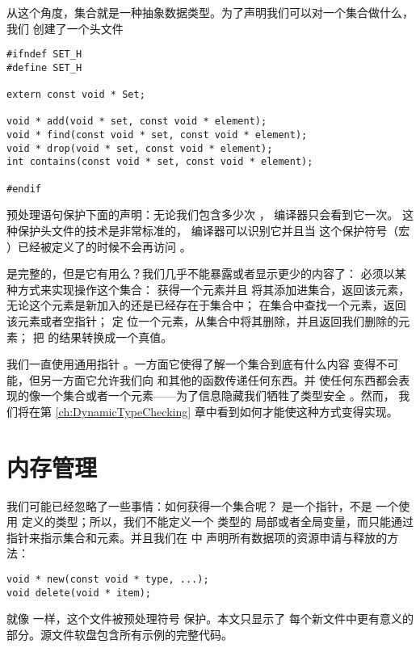 从这个角度，集合就是一种抽象数据类型。为了声明我们可以对一个集合做什么，我们
创建了一个头文件 
\begin{lstlisting}
#ifndef SET_H
#define SET_H

extern const void * Set;

void * add(void * set, const void * element);
void * find(const void * set, const void * element);
void * drop(void * set, const void * element);
int contains(const void * set, const void * element);

#endif
\end{lstlisting}

预处理语句保护下面的声明：无论我们包含多少次 ，
 编译器只会看到它一次。
这种保护头文件的技术是非常标准的， 编译器可以识别它并且当
这个保护符号（宏 ）已经被定义了的时候不会再访问 。

 是完整的，但是它有用么？我们几乎不能暴露或者显示更少的内容了：
 必须以某种方式来实现操作这个集合： 获得一个元素并且
将其添加进集合，返回该元素，无论这个元素是新加入的还是已经存在于集合中；
 在集合中查找一个元素，返回该元素或者空指针； 定
位一个元素，从集合中将其删除，并且返回我们删除的元素； 把
 的结果转换成一个真值。

我们一直使用通用指针 。一方面它使得了解一个集合到底有什么内容
变得不可能，但另一方面它允许我们向  和其他的函数传递任何东西。并
使任何东西都会表现的像一个集合或者一个元素——为了信息隐藏我们牺牲了类型安全
。然而，
我们将在第 \ref{ch:DynamicTypeChecking} 章中看到如何才能使这种方式变得实现。

\section{内存管理}
\label{sec:memoryman}
我们可能已经忽略了一些事情：如何获得一个集合呢？ 是一个指针，不是
一个使用  定义的类型；所以，我们不能定义一个  类型的
局部或者全局变量，而只能通过指针来指示集合和元素。并且我们在  中
声明所有数据项的资源申请与释放的方法：
\begin{lstlisting}
void * new(const void * type, ...);
void delete(void * item);
\end{lstlisting}
就像  一样，这个文件被预处理符号  保护。本文只显示了
每个新文件中更有意义的部分。源文件软盘包含所有示例的完整代码。


